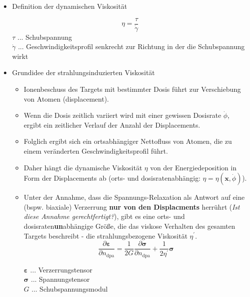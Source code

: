 \documentclass[a4paper, 10pt, 
               numbers=noenddot, toc=graduated,
               headsepline=true, footsepline=true,
               twoside=false, titlepage=true, 
               bibliography=totoc]{scrartcl}
\begin{document}
\begin{itemize}
	\item Definition der dynamischen Viskosität
	
	      \begin{equation}
		  \eta = \frac{\tau }{\dot{\gamma} }
	      \end{equation}
	      $\tau$ ... Schubspannung\\
	      $\dot{\gamma} $ ... Geschwindigkeitsprofil senkrecht zur Richtung in der die Schubspannung wirkt

	\item Grundidee der strahlungsinduzierten Viskosität \cite{hobler2017hpm}
	
		\begin{itemize}
			
			\item Ionenbeschuss des Targets mit bestimmter Dosis führt zur Verschiebung von Atomen (displacement).
			\item Wenn die Dosis zeitlich variiert wird mit einer gewissen Dosisrate $\dot \phi$, ergibt ein zeitlicher Verlauf der Anzahl der Displacements.
			\item Folglich ergibt sich ein ortsabhängiger Nettofluss von Atomen, die zu einem veränderten Geschwindigkeitsprofil führt.
			
			\item Daher hängt die dynamische Viskosität $\eta$ von der Energiedeposition in Form der Displacements ab (orts- und dosisratenabhängig: $\eta = \eta(\bm{x}, \dot{\phi})$).
			
			\item Unter der Annahme, dass die Spannungs-Relaxation als Antwort auf eine (bspw. biaxiale) Verzerrung \textbf{nur von den Displacments} herrührt (\textit{Ist diese Annahme gerechtfertigt?}), gibt es eine orts- und dosisraten\textbf{un}abhängige Größe, die das viskose Verhalten des gesamten Targets beschreibt - die strahlungsbezogene Viskosität $\eta^{'}$.
			\begin{equation}
		  		\frac{\partial \bm{\varepsilon}}{\partial n_\mathrm{dpa} } = \frac{1}{2G} \frac{\partial \bm{\sigma}}{\partial n_\mathrm{dpa}} + \frac{1}{2 \eta^{'} }\bm \sigma
	      	\end{equation}
	      	
	      	$ \bm{\varepsilon}$ ... Verzerrungstensor\\
	      	$\bm\sigma$ ... Spannungstensor\\
	      	$G$ ... Schubspannungsmodul
			

\end{itemize}
\end{itemize}
\end{document}
